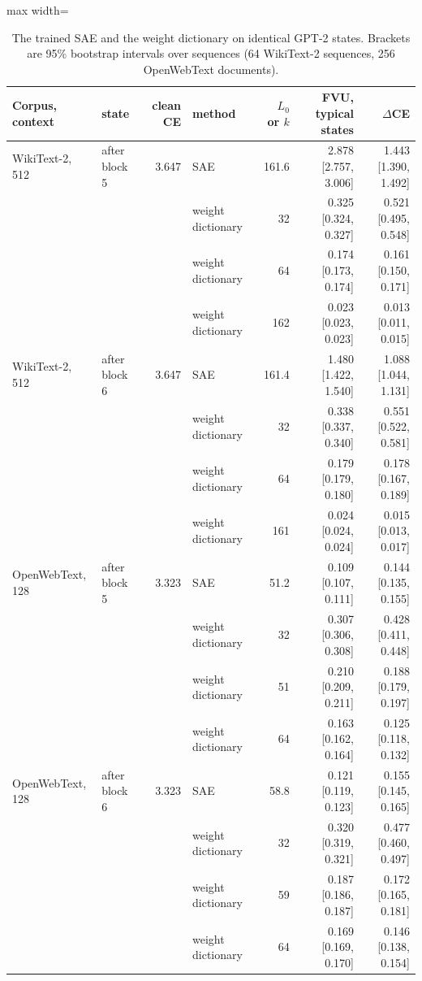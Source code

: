 \begin{table}[H]\centering\scriptsize
\caption{The trained SAE and the weight dictionary on identical GPT-2 states. Brackets are 95\% bootstrap intervals over sequences (64 WikiText-2 sequences, 256 OpenWebText documents).}\label{app:z4-table}
\begin{adjustbox}{max width=\linewidth}
\begin{tabular}{llrlrrr}\toprule
Corpus, context & state & clean CE & method & $L_0$ or $k$ & FVU, typical states & $\Delta$CE \\ \midrule
WikiText-2, 512 & after block 5 & 3.647 & SAE & 161.6 & 2.878 [2.757, 3.006] & 1.443 [1.390, 1.492] \\
 &  &  & weight dictionary & 32 & 0.325 [0.324, 0.327] & 0.521 [0.495, 0.548] \\
 &  &  & weight dictionary & 64 & 0.174 [0.173, 0.174] & 0.161 [0.150, 0.171] \\
 &  &  & weight dictionary & 162 & 0.023 [0.023, 0.023] & 0.013 [0.011, 0.015] \\
WikiText-2, 512 & after block 6 & 3.647 & SAE & 161.4 & 1.480 [1.422, 1.540] & 1.088 [1.044, 1.131] \\
 &  &  & weight dictionary & 32 & 0.338 [0.337, 0.340] & 0.551 [0.522, 0.581] \\
 &  &  & weight dictionary & 64 & 0.179 [0.179, 0.180] & 0.178 [0.167, 0.189] \\
 &  &  & weight dictionary & 161 & 0.024 [0.024, 0.024] & 0.015 [0.013, 0.017] \\
OpenWebText, 128 & after block 5 & 3.323 & SAE & 51.2 & 0.109 [0.107, 0.111] & 0.144 [0.135, 0.155] \\
 &  &  & weight dictionary & 32 & 0.307 [0.306, 0.308] & 0.428 [0.411, 0.448] \\
 &  &  & weight dictionary & 51 & 0.210 [0.209, 0.211] & 0.188 [0.179, 0.197] \\
 &  &  & weight dictionary & 64 & 0.163 [0.162, 0.164] & 0.125 [0.118, 0.132] \\
OpenWebText, 128 & after block 6 & 3.323 & SAE & 58.8 & 0.121 [0.119, 0.123] & 0.155 [0.145, 0.165] \\
 &  &  & weight dictionary & 32 & 0.320 [0.319, 0.321] & 0.477 [0.460, 0.497] \\
 &  &  & weight dictionary & 59 & 0.187 [0.186, 0.187] & 0.172 [0.165, 0.181] \\
 &  &  & weight dictionary & 64 & 0.169 [0.169, 0.170] & 0.146 [0.138, 0.154] \\
\bottomrule\end{tabular}\end{adjustbox}
\end{table}
